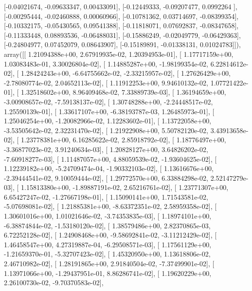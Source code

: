 \documentclass{article}
\begin{document}
       [-0.04021674, -0.09633347,  0.00433091],
       [-0.12449333, -0.09207477,  0.0992264 ],
       [-0.00295444, -0.02460888,  0.00060966],
       [-0.10781362,  0.03714697, -0.08399354],
       [-0.10332175, -0.05430565,  0.09541388],
       [-0.11818071,  0.07692837, -0.08347658],
       [-0.11333448,  0.08893536, -0.06488031],
       [-0.15886249, -0.02049779, -0.06429363],
       [-0.24804977,  0.07452079,  0.08643907],
       [-0.15189891, -0.01338131,  0.01024783]]), array([[  1.21094388e+00,   2.67919935e-02,   1.20394953e-01],
       [  1.17717159e+00,   1.03083483e-01,   3.30026804e-02],
       [  1.14885287e+00,  -1.98199354e-02,   6.22814612e-02],
       [  1.28424243e+00,  -6.64755662e-02,  -2.33215957e-02],
       [  1.27626429e+00,  -2.78080774e-02,   2.04652113e-02],
       [  1.11912253e+00,   9.94610132e-02,   1.07721422e-01],
       [  1.32518602e+00,   8.96409468e-02,   7.33889739e-03],
       [  1.36194659e+00,  -3.00908657e-02,  -7.59138137e-02],
       [  1.30748288e+00,  -2.24448517e-02,   1.25590139e-01],
       [  1.33617107e+00,  -6.38193787e-03,   1.26485973e-01],
       [  1.25046254e+00,  -1.20082966e-02,   1.12283602e-01],
       [  1.13722058e+00,  -3.53505642e-02,   2.32231470e-02],
       [  1.21922908e+00,   5.50782120e-02,   3.43913658e-02],
       [  1.23778381e+00,   6.16285622e-02,   2.85918792e-02],
       [  1.18776497e+00,  -3.36877023e-02,   3.91240634e-03],
       [  1.20828127e+00,   3.64826202e-02,  -7.60918277e-03],
       [  1.11487057e+00,   4.88059539e-02,  -1.93604625e-02],
       [  1.12239182e+00,  -5.24709474e-04,  -1.90332103e-02],
       [  1.13616676e+00,  -2.39444541e-02,   9.10059444e-02],
       [  1.29772570e+00,   6.33884298e-02,   2.52147279e-03],
       [  1.15813380e+00,  -1.89887191e-02,   2.65216761e-02],
       [  1.23771307e+00,   6.65427247e-02,  -1.27667198e-01],
       [  1.15090141e+00,   1.71543581e-02,  -5.07698081e-02],
       [  1.21885381e+00,  -8.63372351e-02,   2.58959358e-02],
       [  1.30601016e+00,   1.01021646e-02,  -3.74353835e-03],
       [  1.18974101e+00,  -6.38874844e-02,  -1.53180120e-02],
       [  1.38579486e+00,   2.82370865e-03,   6.72252128e-02],
       [  1.24908468e+00,  -9.58692841e-02,  -3.11212429e-02],
       [  1.46458547e+00,   4.27319887e-04,  -6.29508571e-03],
       [  1.17561129e+00,  -1.21659370e-01,  -5.32707423e-02],
       [  1.45320950e+00,   1.13618806e-02,   2.46710982e-02],
       [  1.28191865e+00,   2.91840504e-02,  -7.37499901e-02],
       [  1.13971066e+00,  -1.29437951e-01,   8.86286741e-02],
       [  1.19620229e+00,   2.26100730e-02,  -9.70370583e-02],
\end{document}
